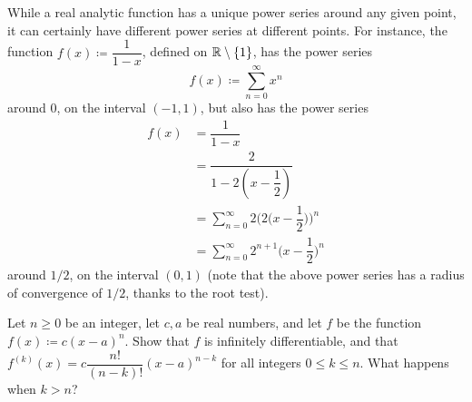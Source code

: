 \begin{rmk}\label{ii:4.2.13}
  While a real analytic function has a unique power series around any given point, it can certainly have different power series at different points.
  For instance, the function \(f(x) \coloneqq \dfrac{1}{1 - x}\), defined on \(\mathbb{R} \setminus \left\lbrace1\right\rbrace\), has the power series
  \[
    f(x) \coloneqq \sum_{n = 0}^\infty x^n
  \]
  around \(0\), on the interval \((-1, 1)\), but also has the power series
  \begin{align*}
    f(x) & = \dfrac{1}{1 - x}                                                  \\
         & = \dfrac{2}{1 - 2(x - \dfrac{1}{2})}                                \\
         & = \sum_{n = 0}^\infty 2 \bigg(2\bigg(x - \dfrac{1}{2}\bigg)\bigg)^n \\
         & = \sum_{n = 0}^\infty 2^{n + 1} \bigg(x - \dfrac{1}{2}\bigg)^n
  \end{align*}
  around \(1 / 2\), on the interval \((0, 1)\)
  (note that the above power series has a radius of convergence of \(1 / 2\), thanks to the root test).
\end{rmk}

\exercisesection

\begin{ex}\label{ii:ex:4.2.1}
  Let \(n \geq 0\) be an integer, let \(c, a\) be real numbers, and let \(f\) be the function \(f(x) \coloneqq c (x - a)^n\).
  Show that \(f\) is infinitely differentiable, and that \(f^{(k)}(x) = c \dfrac{n!}{(n - k)!} (x - a)^{n - k}\) for all integers \(0 \leq k \leq n\).
  What happens when \(k > n\)?
\end{ex}

